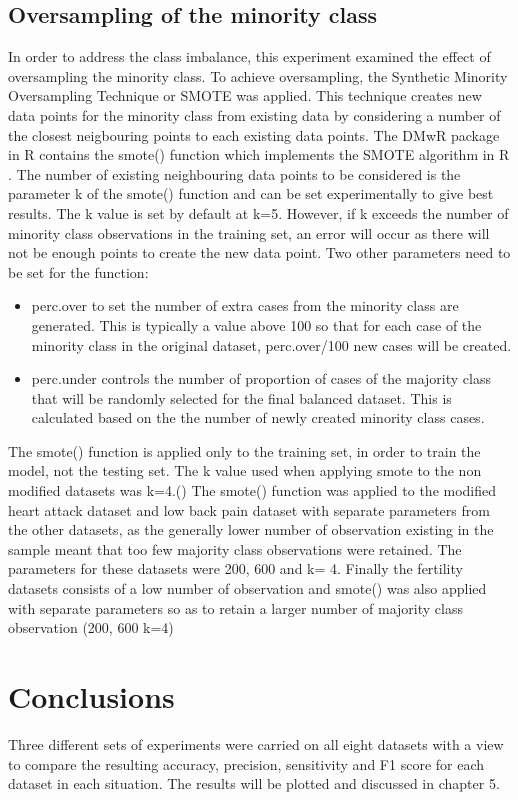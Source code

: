\subsection{Oversampling of the minority class}
In order to address the class imbalance, this experiment examined the effect of oversampling the minority class. To achieve oversampling, the Synthetic Minority Oversampling Technique or SMOTE \citep{Chawla:2002ty} was applied.
This technique creates new data points for the minority class from existing data by considering a number of the closest neigbouring points to each existing data points.
The DMwR package in R contains the smote() function which implements the SMOTE algorithm in R \citep{}.
The number of existing neighbouring data points to be considered is the parameter k of the smote() function and can be set experimentally to give best results.\newline
The k value is set by default at k=5. However, if k exceeds the number of minority class observations in the training set, an error will occur as there will not be enough points to create the new data point.\newline
Two other parameters need to be set for the function: 
\begin{itemize}
    \item perc.over to set the number of extra cases from the minority class are generated. This is typically a value above 100 so that for each case of the minority class in the original dataset, perc.over/100 new cases will be created.
    \item perc.under controls the number of proportion of cases of the majority class that will be randomly selected for the final balanced dataset. This is calculated based on the the number of newly created minority class cases. 
\end{itemize}

The smote() function is applied only to the training set, in order to train the model,  not the testing set.\newline
The k value used when applying smote to the non modified datasets was k=4.\newline()
The smote() function was applied to the modified heart attack dataset and low back pain dataset with separate parameters from the other datasets, as the generally lower number of observation existing in the sample meant that too few majority class observations were retained. The parameters for these datasets were 200, 600 and k= 4.
Finally the fertility datasets consists of a low number of observation and smote() was also applied with separate parameters so as to retain a larger number of majority class observation (200, 600 k=4) %



\section{Conclusions}
Three different sets of experiments were carried on all eight datasets with a view to compare the resulting accuracy, precision, sensitivity and F1 score for each dataset in each situation. The results will be plotted and discussed in chapter 5.


